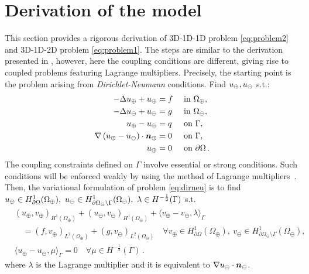 
\section{Derivation of the model}
This section provides a rigorous derivation of 3D-1D-1D problem \eqref{eq:problem2} and 3D-1D-2D problem \eqref{eq:problem1}. 
The steps are similar to the derivation presented in \cite{laurino_m2an}, 
however, here the coupling conditions are different,
giving rise to coupled problems featuring Lagrange multipliers. 
Precisely, the starting point is the problem arising from \emph{Dirichlet-Neumann} conditions. 
Find $u_{\oplus},u_{\ominus}$ s.t.:
\begin{subequations}\label{eq:dirneu}
\begin{align}
\label{eq:dirneu1}
- \Delta \up  + \up &= f  && \text{ in } \Omega_{\oplus},\\
\label{eq:dirneu2}
- \Delta \uf  + \uf &= g  && \text{ in } \Omega_\ominus,\\
\label{eq:dirneu4}
\up - \uf &= q && \text{ on }  \Gamma,\\
\label{eq:dirneu3}
\nabla\left( \up - \uf \right) \cdot \nn_{\oplus} &=0  && \text{ on } \Gamma,\\
\label{eq:dirneu5}
\up &= 0 && \text{ on } \partial \Omega\,.
\end{align}
\end{subequations}
The coupling constraints defined on $\Gamma$ involve essential or strong conditions.
Such conditions will be enforced weakly by using the method of Lagrange multipliers~\cite{MR359352}. Then, the variational formulation of problem \eqref{eq:dirneu}
is to find $\up \in H^1_{\partial\Omega}(\Omega_\oplus), \ \uf \in H^1_{\partial\Omega_\ominus\setminus\Gamma}(\Omega_\ominus), \ \lambda \in H^{-\frac 1 2}(\Gamma)$ s.t.
\begin{subequations}\label{eq:weak_dirneu}
\begin{align}
&(u_\oplus,v_\oplus)_{H^1(\Omega_\oplus)} + (u_\ominus,v_\ominus)_{H^1(\Omega_\ominus)} 
+ \langle  v_\oplus - v_\ominus, \lambda \rangle_{\Gamma} 
\\
\nonumber
&\quad = (f,v_\oplus)_{L^2(\Omega_\oplus)} + (g,v_\ominus)_{L^2(\Omega_\ominus)}
\quad \forall v_\oplus \in H^1_{\partial\Omega}(\Omega_\oplus), \ v_\ominus \in H^1_{\partial\Omega_\ominus\setminus\Gamma}(\Omega_\ominus),
\\
& \langle u_\oplus - u_\ominus, \mu \rangle_{\Gamma} = 0
\quad \forall  \mu \in H^{-\frac 1 2}(\Gamma)\,.
\end{align}
\end{subequations}
where $\lambda$ is the Lagrange multiplier and it is equivalent to $\nabla u_{\ominus} \cdot \boldsymbol n_\ominus$.

